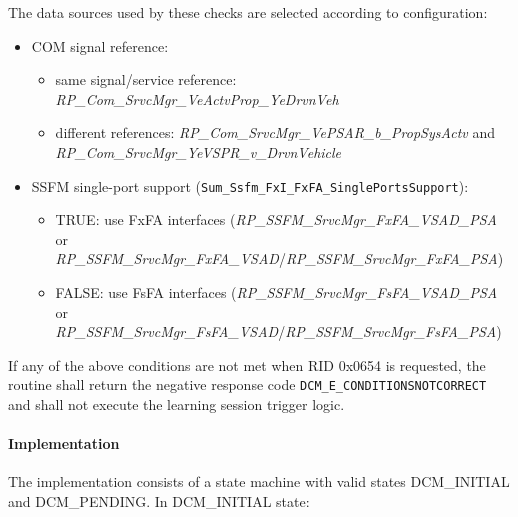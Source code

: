 The data sources used by these checks are selected according to configuration:
\begin{itemize}
    \item COM signal reference:
    \begin{itemize}
        \item same signal/service reference: \textit{RP\_Com\_SrvcMgr\_VeActvProp\_YeDrvnVeh}
        \item different references: \textit{RP\_Com\_SrvcMgr\_VePSAR\_b\_PropSysActv} and \textit{RP\_Com\_SrvcMgr\_YeVSPR\_v\_DrvnVehicle}
    \end{itemize}
    \item SSFM single-port support (\texttt{Sum\_Ssfm\_FxI\_FxFA\_SinglePortsSupport}):
    \begin{itemize}
        \item TRUE: use FxFA interfaces (\textit{RP\_SSFM\_SrvcMgr\_FxFA\_VSAD\_PSA} or \textit{RP\_SSFM\_SrvcMgr\_FxFA\_VSAD}/\textit{RP\_SSFM\_SrvcMgr\_FxFA\_PSA})
        \item FALSE: use FsFA interfaces (\textit{RP\_SSFM\_SrvcMgr\_FsFA\_VSAD\_PSA} or \textit{RP\_SSFM\_SrvcMgr\_FsFA\_VSAD}/\textit{RP\_SSFM\_SrvcMgr\_FsFA\_PSA})
    \end{itemize}
\end{itemize}

If any of the above conditions are not met when RID 0x0654 is requested, the routine shall return the negative response code \texttt{DCM\_E\_CONDITIONSNOTCORRECT} and shall not execute the learning session trigger logic.

\paragraph{Implementation}
The implementation consists of a state machine with valid states DCM\_INITIAL and DCM\_PENDING. In DCM\_INITIAL state:

